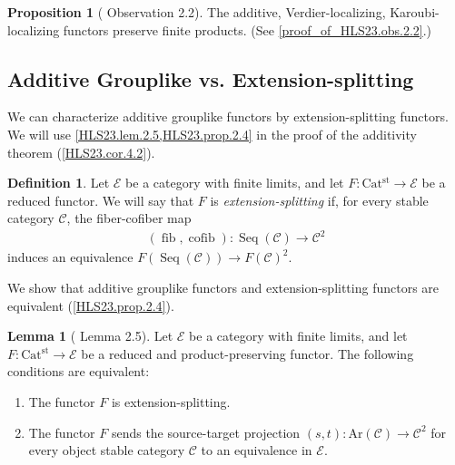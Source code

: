 \documentclass[a4paper,dvipdfmx,11pt,reqno]{amsart}
\DeclareMathOperator{\fib}{fib}
\DeclareMathOperator{\cofib}{cofib}
\newcommand{\C}{\mathcal{C}}
\newcommand{\E}{\mathcal{E}}
\DeclareMathOperator{\Seq}{Seq}
\newcommand{\Catst}{\mathrm{Cat^{st}}}
\newcommand{\Ar}{\mathrm{Ar}}
\theoremstyle{definition}
\newtheorem{definition}[theorem]{Definition}
\newtheorem{lemma}[theorem]{Lemma}
\newtheorem{proposition}[theorem]{Proposition}
\begin{document}
\begin{proposition}[\cite{HLS23} Observation 2.2] \label{HLS23.obs.2.2} %
  The additive, Verdier-localizing, Karoubi-localizing functors preserve finite products.
  (See \cref{proof_of_HLS23.obs.2.2}.)
\end{proposition}


\subsection{Additive Grouplike vs. Extension-splitting}

We can characterize additive grouplike functors by extension-splitting functors.
We will use \cref{HLS23.lem.2.5,HLS23.prop.2.4} in the proof of the additivity theorem (\cref{HLS23.cor.4.2}).

\begin{definition}
  Let $\E$ be a category with finite limits, and let $F : \Catst \to \E$ be a reduced functor.
  We will say that $F$ is \textit{extension-splitting} if, for every stable category $\C$, the fiber-cofiber map
  \begin{align*}
    (\fib,\cofib) : \Seq(\C) \to \C^2
  \end{align*}
  induces an equivalence $F(\Seq(\C)) \to F(\C)^2$.
\end{definition}

We show that additive grouplike functors and extension-splitting functors are equivalent (\cref{HLS23.prop.2.4}). 

\begin{lemma}[\cite{HLS23} Lemma 2.5] \label{HLS23.lem.2.5}
  Let $\E$ be a category with finite limits, and let $F : \Catst \to \E$ be a reduced and product-preserving functor.
  The following conditions are equivalent:
  \begin{enumerate}
    \item The functor $F$ is extension-splitting.
    \item The functor $F$ sends the source-target projection $(s,t) : \Ar(\C) \to \C^2$ for every object stable category $\C$ to an equivalence in $\E$.
  \end{enumerate}
\end{lemma}
\end{document}
